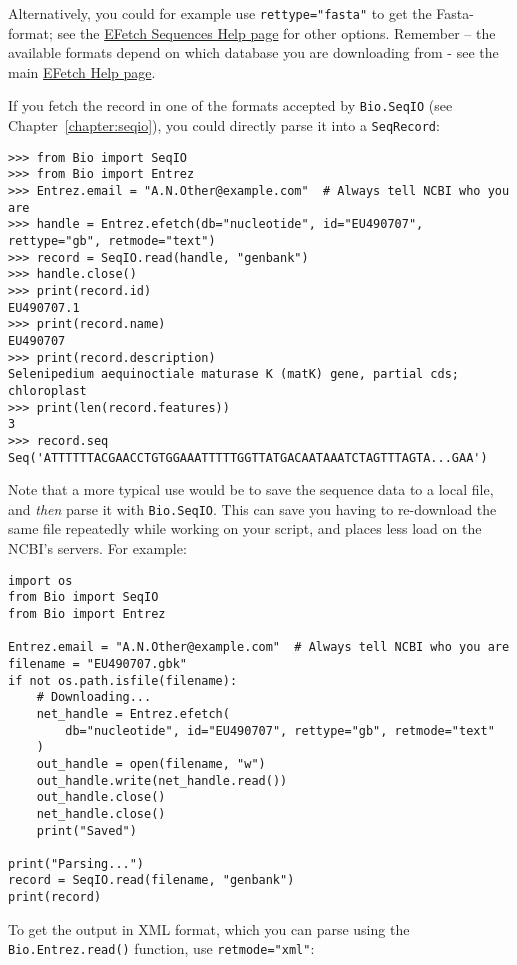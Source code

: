 Alternatively, you could for example use \verb+rettype="fasta"+ to get the Fasta-format; see the \href{https://www.ncbi.nlm.nih.gov/books/NBK25499/#chapter4.EFetch}{EFetch Sequences Help page} for other options. Remember -- the available formats depend on which database you are downloading from - see the main \href{https://www.ncbi.nlm.nih.gov/books/NBK25499/#chapter4.EFetch}{EFetch Help page}.

If you fetch the record in one of the formats accepted by \verb+Bio.SeqIO+ (see Chapter~\ref{chapter:seqio}), you could directly parse it into a \verb+SeqRecord+:

\begin{verbatim}
>>> from Bio import SeqIO
>>> from Bio import Entrez
>>> Entrez.email = "A.N.Other@example.com"  # Always tell NCBI who you are
>>> handle = Entrez.efetch(db="nucleotide", id="EU490707", rettype="gb", retmode="text")
>>> record = SeqIO.read(handle, "genbank")
>>> handle.close()
>>> print(record.id)
EU490707.1
>>> print(record.name)
EU490707
>>> print(record.description)
Selenipedium aequinoctiale maturase K (matK) gene, partial cds; chloroplast
>>> print(len(record.features))
3
>>> record.seq
Seq('ATTTTTTACGAACCTGTGGAAATTTTTGGTTATGACAATAAATCTAGTTTAGTA...GAA')
\end{verbatim}

Note that a more typical use would be to save the sequence data to a local file, and \emph{then} parse it with \verb|Bio.SeqIO|.  This can save you having to re-download the same file repeatedly while working on your script, and places less load on the NCBI's servers.  For example:

\begin{verbatim}
import os
from Bio import SeqIO
from Bio import Entrez

Entrez.email = "A.N.Other@example.com"  # Always tell NCBI who you are
filename = "EU490707.gbk"
if not os.path.isfile(filename):
    # Downloading...
    net_handle = Entrez.efetch(
        db="nucleotide", id="EU490707", rettype="gb", retmode="text"
    )
    out_handle = open(filename, "w")
    out_handle.write(net_handle.read())
    out_handle.close()
    net_handle.close()
    print("Saved")

print("Parsing...")
record = SeqIO.read(filename, "genbank")
print(record)
\end{verbatim}

To get the output in XML format, which you can parse using the \verb+Bio.Entrez.read()+ function, use \verb+retmode="xml"+:

